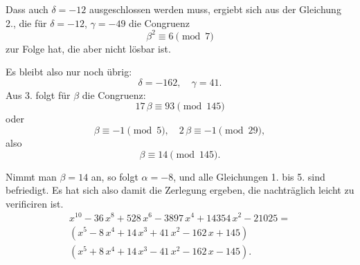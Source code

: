 Dass auch $\delta = -12$ ausgeschlossen werden muss, ergiebt sich
aus der Gleichung 2., die für $\delta = -12$, $\gamma = -49$ die Congruenz
\[
\beta^2 \equiv 6 \pmod{7}
\]
zur Folge hat, die aber nicht lösbar ist.

Es bleibt also nur noch übrig:
\[
\delta = -162,\quad \gamma = 41.
\]
Aus 3. folgt für $\beta$ die Congruenz:
\[
17\,\beta \equiv 93 \pmod{145}
\]
oder
\[
\beta \equiv -1 \pmod{5},\quad 2\,\beta \equiv -1 \pmod{29},
\]
also
\[
\beta \equiv 14 \pmod{145}.
\]

Nimmt man $\beta = 14$ an, so folgt $\alpha = -8$, und alle Gleichungen 1. bis 5. sind befriedigt. Es hat sich also damit die
Zerlegung ergeben, die nachträglich leicht zu verificiren ist.
\[
\begin{aligned}
x^{10} - 36\,x^8 + 528\,x^6 - 3897\,x^4 + 14354\,x^2 - 21025 = \\
(x^5 - 8\,x^4 + 14\,x^3 + 41\,x^2 - 162\,x + 145)\\
(x^5 + 8\,x^4 + 14\,x^3 - 41\,x^2 - 162\,x - 145).
\end{aligned}
\]
